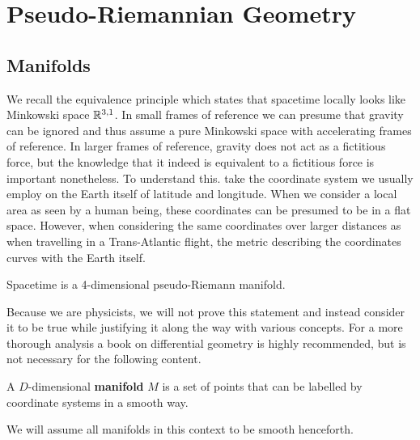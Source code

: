 \documentclass{article}
\begin{document}
 	\section{Pseudo-Riemannian Geometry} \label{ch:2}
 	\subsection{Manifolds}
 		We recall the equivalence principle which states that spacetime locally looks like Minkowski space $\mathbb{R}^{3,1}$. In small frames of reference we can presume that gravity can be ignored and thus assume a pure Minkowski space with accelerating frames of reference. In larger frames of reference, gravity does not act as a fictitious force, but the knowledge that it indeed is equivalent to a fictitious force is important nonetheless. To understand this. take the coordinate system we usually employ on the Earth itself of latitude and longitude. When we consider a local area as seen by a human being, these coordinates can be presumed to be in a flat space. However, when considering the same coordinates over larger distances as when travelling in a Trans-Atlantic flight, the metric describing the coordinates curves with the Earth itself.
 		
 		\begin{thm}
 			Spacetime is a 4-dimensional pseudo-Riemann manifold.
 		\end{thm}
 	
 		Because we are physicists, we will not prove this statement and instead consider it to be true while justifying it along the way with various concepts. For a more thorough analysis a book on differential geometry is highly recommended, but is not necessary for the following content.
 		
 		\begin{defn}
 			A $D$-dimensional\textbf{ manifold} $M$ is a set of points that can be labelled by coordinate systems in a smooth way.
 		\end{defn}
 		
 		We will assume all manifolds in this context to be smooth henceforth. 
 		
\end{document}
